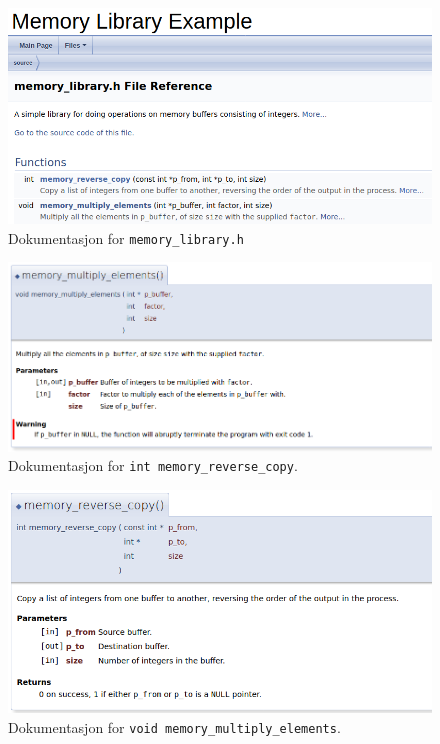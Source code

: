 \begin{alphasection}
\begin{figure}[H]
    \centering
    \includegraphics[width=131mm]{Main/figures/doxygenfil2.png}
    \caption{Dokumentasjon for \texttt{memory\_library.h}}
    \label{fig:2-dox-fig2}
\end{figure}

\begin{figure}[H]
    \centering
    \includegraphics[width=135mm]{Main/figures/doxygenfil3.png}
    \caption{Dokumentasjon for \texttt{int memory\_reverse\_copy}.}
    \label{fig:2-dox-fig3}
\end{figure}



\begin{figure}[H]
    \centering
    \includegraphics[width=135mm]{Main/figures/doxygen4.png}
    \caption{Dokumentasjon for \texttt{void memory\_multiply\_elements}.}
    \label{fig:2-dox-fig4}
\end{figure}

\end{alphasection}


\setcounter{section}{0}